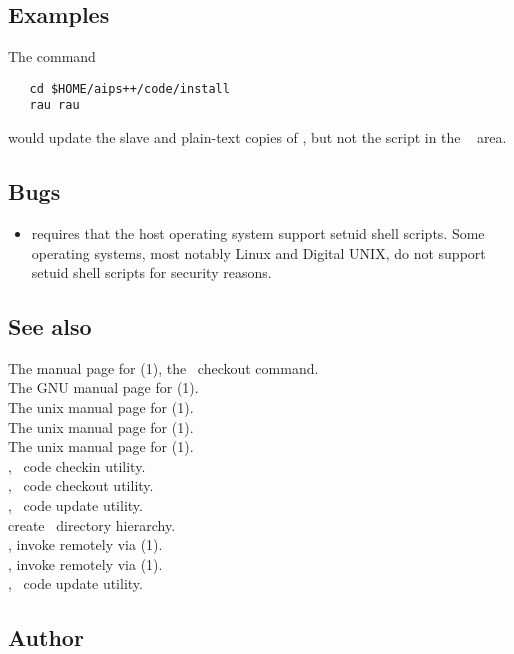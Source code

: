 \subsection*{Examples}
 
The command
 
\begin{verbatim}
   cd $HOME/aips++/code/install
   rau rau
\end{verbatim}
 
\noindent
would update the slave and plain-text copies of , but not the script
in the \aipspp\  area.

\subsection*{Bugs}
\begin{itemize}
\item
    requires that the host operating system support setuid
   shell scripts.  Some operating systems, most notably Linux and
   Digital UNIX, do not support setuid shell scripts for security
   reasons.
\end{itemize}

\subsection*{See also}

The manual page for (1), the \rcs\ checkout command.\\
The GNU manual page for (1).\\
The unix manual page for (1).\\
The unix manual page for (1).\\
The unix manual page for (1).\\
, \aipspp\ code checkin utility.\\
, \aipspp\ code checkout utility.\\
, \aipspp\ code update utility.\\
 create \aipspp\ directory hierarchy.\\
, invoke  remotely via (1).\\
, invoke  remotely via (1).\\
, \aipspp\ code update utility.
 
\subsection*{Author}

